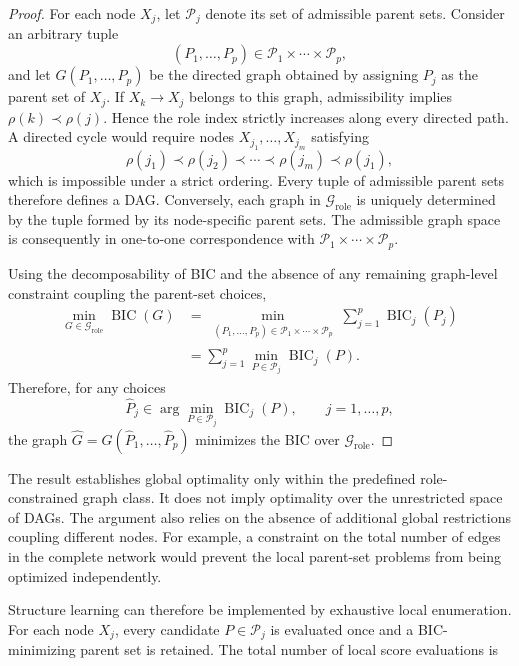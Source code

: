 \begin{proof} For each node \(X_j\), let \(\mathcal P_j\) denote its set of admissible parent sets. Consider an arbitrary tuple
\[
(P_1,\ldots,P_p)
\in
\mathcal P_1\times\cdots\times\mathcal P_p,
\]
and let \(G(P_1,\ldots,P_p)\) be the directed graph obtained by assigning
\(P_j\) as the parent set of \(X_j\). If
\(X_k\rightarrow X_j\) belongs to this graph, admissibility implies
\(\rho(k)\prec\rho(j)\). Hence the role index strictly increases along every
directed path. A directed cycle would require nodes
\(X_{j_1},\ldots,X_{j_m}\) satisfying
\[
\rho(j_1)
\prec
\rho(j_2)
\prec
\cdots
\prec
\rho(j_m)
\prec
\rho(j_1),
\]
which is impossible under a strict ordering. Every tuple of admissible parent
sets therefore defines a DAG. Conversely, each graph in
\(\mathcal G_{\mathrm{role}}\) is uniquely determined by the tuple formed by
its node-specific parent sets. The admissible graph space is consequently in
one-to-one correspondence with
\(\mathcal P_1\times\cdots\times\mathcal P_p\).

Using the decomposability of BIC and the absence of any remaining graph-level
constraint coupling the parent-set choices,
\[
\begin{aligned}
\min_{G\in\mathcal G_{\mathrm{role}}}
\operatorname{BIC}(G)
&=
\min_{\substack{
(P_1,\ldots,P_p)\in
\mathcal P_1\times\cdots\times\mathcal P_p}}
\sum_{j=1}^{p}
\operatorname{BIC}_j(P_j)
\\
&=
\sum_{j=1}^{p}
\min_{P\in\mathcal P_j}
\operatorname{BIC}_j(P).
\end{aligned}
\]
Therefore, for any choices
\[
\widehat P_j
\in
\arg\min_{P\in\mathcal P_j}
\operatorname{BIC}_j(P),
\qquad
j=1,\ldots,p,
\]
the graph
\(\widehat G=G(\widehat P_1,\ldots,\widehat P_p)\)
minimizes the BIC over
\(\mathcal G_{\mathrm{role}}\).
\end{proof}

The result establishes global optimality only within the predefined
role-constrained graph class. It does not imply optimality over the
unrestricted space of DAGs. The argument also relies on the absence of
additional global restrictions coupling different nodes. For example, a
constraint on the total number of edges in the complete network would prevent
the local parent-set problems from being optimized independently.

Structure learning can therefore be implemented by exhaustive local
enumeration. For each node \(X_j\), every candidate
\(P\in\mathcal P_j\) is evaluated once and a BIC-minimizing parent set is
retained. The total number of local score evaluations is

